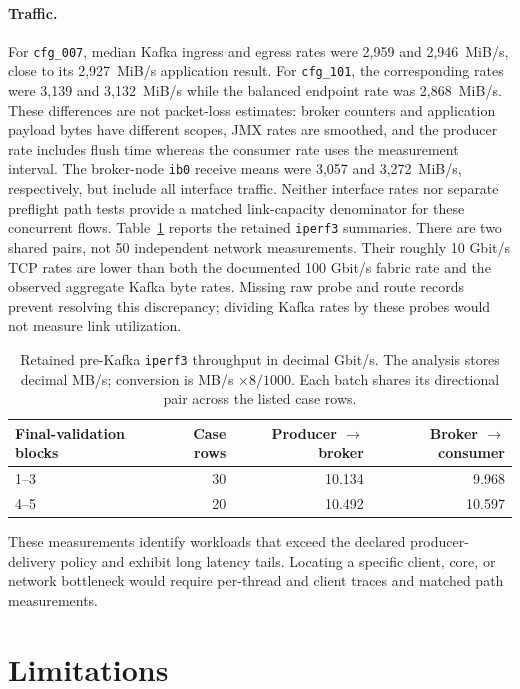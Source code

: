 \documentclass[10pt]{article}
\begin{document}
\paragraph{Traffic.}
For \texttt{cfg\_007}, median Kafka ingress and egress rates were
2,959 and 2,946~MiB/s, close to its 2,927~MiB/s application result. For
\texttt{cfg\_101}, the corresponding rates were 3,139 and 3,132~MiB/s while
the balanced endpoint rate was 2,868~MiB/s. These differences are not
packet-loss estimates: broker counters and application payload bytes have
different scopes, JMX rates are smoothed, and the producer rate includes flush time whereas
the consumer rate uses the measurement interval. The broker-node
\texttt{ib0} receive means were 3,057 and 3,272~MiB/s, respectively, but
include all interface traffic. Neither interface rates nor separate
preflight path tests provide a matched link-capacity denominator for these
concurrent flows.  Table~\ref{tab:network-probes} reports the retained
\texttt{iperf3} summaries.  There are two shared pairs, not 50 independent
network measurements.  Their roughly 10 Gbit/s TCP rates are lower than both
the documented 100 Gbit/s fabric rate and the observed aggregate Kafka byte
rates.  Missing raw probe and route records prevent resolving this discrepancy;
dividing Kafka rates by these probes would not measure link utilization.

\begin{table}[!htbp]
\centering
\footnotesize
\begin{tabular}{@{}lrrr@{}}
\toprule
Final-validation blocks & Case rows & Producer $\rightarrow$ broker & Broker $\rightarrow$ consumer \\
\midrule
1--3 & 30 & 10.134 & 9.968 \\
4--5 & 20 & 10.492 & 10.597 \\
\bottomrule
\end{tabular}
\caption{Retained pre-Kafka \texttt{iperf3} throughput in decimal Gbit/s.
The analysis stores decimal MB/s; conversion is MB/s $\times 8/1000$.
Each batch shares its directional pair across the listed case rows.}
\label{tab:network-probes}
\end{table}

These measurements identify workloads that exceed the declared producer-delivery
policy and exhibit long latency tails.  Locating a specific client, core, or
network bottleneck would require per-thread and client traces and matched
path measurements.



\section{Limitations}
\label{sec:threats}
\end{document}
